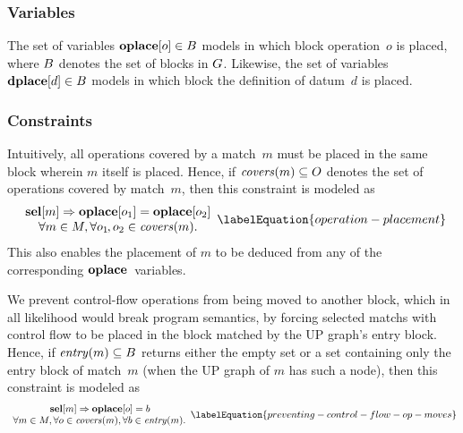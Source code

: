 \subsubsection{Variables}

The set of \glspl{variable} \mbox{$\mVar{oplace}[o] \in \mBlockSet$} models in
which \gls{block} \gls{operation}~$o$ is placed, where $B$ denotes the
set of \glspl{block} in $G$.
%
Likewise, the set of \glspl{variable} \mbox{$\mVar{dplace}[d] \in \mBlockSet$}
models in which \gls{block} the definition of \gls{datum}~$d$ is placed.


\subsubsection{Constraints}

Intuitively, all \glspl{operation} covered by a \gls{match}~$m$ must be placed
in the same \gls{block} wherein $m$ itself is placed.
%
Hence, if \mbox{$\mCovers(m) \subseteq \mOpSet$} denotes the set of
\glspl{operation} covered by \gls{match}~$m$, then this \gls{constraint} is
modeled as
%
\begin{equation}
  \begin{array}{c}
    \mVar{sel}[m] \mImp \mVar{oplace}[o_1] = \mVar{oplace}[o_2] \\
    \forall m \in \mMatchSet,
    \forall o_1\hspace{-1pt}, o_2 \in \mCovers(m).
  \end{array}
  \labelEquation{operation-placement}
\end{equation}
%
This also enables the placement of $m$ to be deduced from any of the
corresponding $\mVar{oplace}$~\glspl{variable}.

We prevent control-flow \glspl{operation} from being moved to another
\gls{block}, which in all likelihood would break \gls{program} semantics, by
forcing selected \glspl{match} with control flow to be placed in the \gls{block}
matched by the \gls{UP graph}'s \gls{entry block}.
%
Hence, if \mbox{$\operatorname{\textrm{\textit{entry}}}(m) \subseteq B$} returns either the empty set
or a set containing only the \gls{entry block} of match~$m$ (when the \gls{UP
  graph} of $m$ has such a node), then this \gls{constraint} is modeled as
%
\begin{equation}
  \begin{array}{c}
    \mVar{sel}[m] \mImp \mVar{oplace}[o] = b\hspace{-1.2pt} \\
    \forall m \in \mMatchSet,
    \forall o \in \mCovers(m),
    \forall b \in \mEntry(m).
  \end{array}
  \labelEquation{preventing-control-flow-op-moves}
\end{equation}

